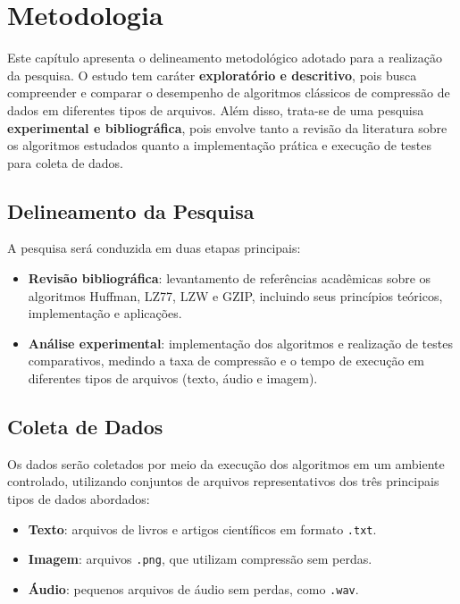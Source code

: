 \chapter{Metodologia}
\label{c.metodologia}

Este capítulo apresenta o delineamento metodológico adotado para a realização da pesquisa. O estudo tem caráter \textbf{exploratório e descritivo}, pois busca compreender e comparar o desempenho de algoritmos clássicos de compressão de dados em diferentes tipos de arquivos. Além disso, trata-se de uma pesquisa \textbf{experimental e bibliográfica}, pois envolve tanto a revisão da literatura sobre os algoritmos estudados quanto a implementação prática e execução de testes para coleta de dados.

\section{Delineamento da Pesquisa}

A pesquisa será conduzida em duas etapas principais:

\begin{itemize}
    \item \textbf{Revisão bibliográfica}: levantamento de referências acadêmicas sobre os algoritmos Huffman, LZ77, LZW e GZIP, incluindo seus princípios teóricos, implementação e aplicações.
    \item \textbf{Análise experimental}: implementação dos algoritmos e realização de testes comparativos, medindo a taxa de compressão e o tempo de execução em diferentes tipos de arquivos (texto, áudio e imagem).
\end{itemize}

\section{Coleta de Dados}

Os dados serão coletados por meio da execução dos algoritmos em um ambiente controlado, utilizando conjuntos de arquivos representativos dos três principais tipos de dados abordados: 

\begin{itemize}
    \item \textbf{Texto}: arquivos de livros e artigos científicos em formato \texttt{.txt}.
    \item \textbf{Imagem}: arquivos \texttt{.png}, que utilizam compressão sem perdas.
    \item \textbf{Áudio}: pequenos arquivos de áudio sem perdas, como \texttt{.wav}.
\end{itemize}

